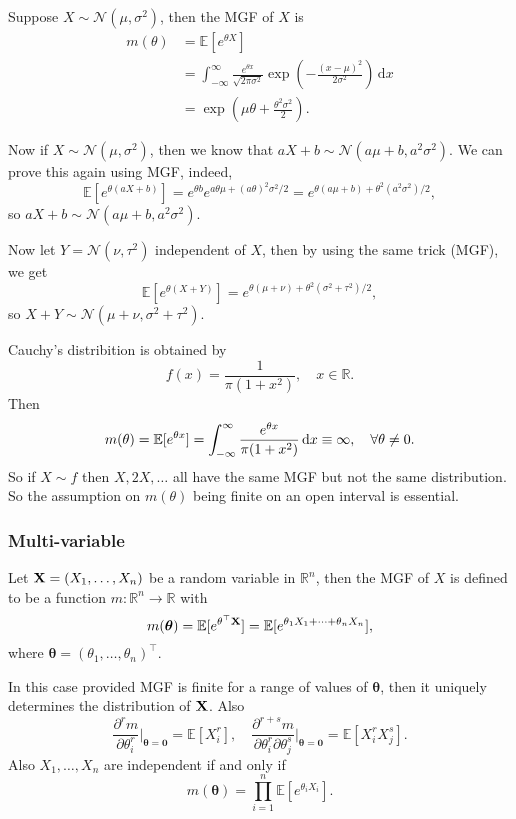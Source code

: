 \begin{example}
    Suppose $X\sim\mathcal N(\mu,\sigma^2)$, then the MGF of $X$ is
    \begin{align*}
        m(\theta)&=\mathbb E[e^{\theta X}]\\
        &=\int_{-\infty}^\infty \frac{e^{\theta x}}{\sqrt{2\pi \sigma^2}}\exp\left( -\frac{(x-\mu)^2}{2\sigma^2}  \right)\,\mathrm dx\\
        &=\exp \left( \mu\theta+\frac{\theta^2\sigma^2}{2} \right).
    \end{align*}

    Now if $X\sim\mathcal N(\mu,\sigma^2)$, then we know that $aX+b\sim\mathcal N(a\mu+b,a^2\sigma^2)$.
    We can prove this again using MGF, indeed,
    $$\mathbb E[e^{\theta(aX+b)}]=e^{\theta b}e^{a\theta\mu+(a\theta)^2\sigma^2/2}=e^{\theta(a\mu +b)+\theta^2(a^2\sigma^2)/2},$$
    so $aX+b\sim\mathcal N(a\mu+b,a^2\sigma^2)$.

    Now let $Y=\mathcal N(\nu,\tau^2)$ independent of $X$, then by using the same trick (MGF), we get
    \[
        \mathbb E[e^{\theta(X+Y)}]=e^{\theta(\mu+\nu)+\theta^2(\sigma^2+\tau^2)/2},
    \]
    so $X+Y\sim\mathcal N(\mu+\nu,\sigma^2+\tau^2)$.
\end{example}
\begin{example}
    Cauchy's distribition is obtained by
    \[
        f(x)=\frac{1}{\pi(1+x^2)},\quad x\in\mathbb R.
    \]
    Then 
    \[
        m(\theta) = {\mathbb{E}}[e^{\theta x}] = \int_{-\infty}^{\infty} \frac{e^{\theta x}}{\pi(1+x^2)} \,\mathrm{d}x \equiv \infty,\quad \forall \theta\neq 0.
    \]
    So if $X\sim f$ then $X,2X,\ldots$ all have the same MGF but not the same distribution.
    So the assumption on $m(\theta)$ being finite on an open interval is essential.
\end{example}

\subsubsection*{Multi-variable}
\begin{definition}
    \begin{definition}
        Let ${\bf X}=(X_1,\ldots,X_n)$ be a random variable in $\mathbb R^n$, then the MGF of $X$ is defined to be a function $m:\mathbb R^n\to\mathbb R$ with
        $$m(\boldsymbol{\theta})=\mathbb E[e^{\theta^\top {\bf X}}]=\mathbb E[e^{\theta_1X_1+\cdots+\theta_nX_n}],$$
        where $\boldsymbol{\theta}=(\theta_1,\ldots,\theta_n)^\top$.
    \end{definition}
\end{definition}
\begin{theorem}
    In this case provided MGF is finite for a range of values of $ \boldsymbol{\theta} $, then it uniquely determines the distribution of $ {\bf X} $. Also 
    \[
        \frac{\partial^rm}{\partial\theta_i^r}\Big|_{\boldsymbol{\theta}=\mathbf{0}}=\mathbb E[X_i^r],\quad \frac{\partial^{r+s}m}{\partial\theta_i^r\partial\theta_j^s}\Big|_{\boldsymbol{\theta}=\mathbf{0}}=\mathbb E[X_i^rX_j^s].
    \]
    Also $X_1,\ldots,X_n$ are independent if and only if 
    $$m(\boldsymbol{\theta})=\prod_{i=1}^n\mathbb E[e^{\theta_iX_i}].$$
\end{theorem}